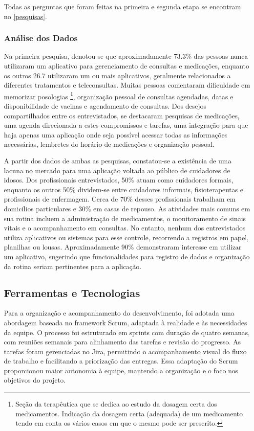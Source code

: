 \documentclass[
	article,			%
	12pt,				%
	oneside,			%
	a4paper,			%
    BIBLATEX,           %
	english,			%
	brazil,				%
	sumario=tradicional
	]{abntex2}
\begin{document}
Todas as perguntas que foram feitas na primeira e segunda etapa se encontram no \autoref{pesquisas}.

\subsubsection{Análise dos Dados}

Na primeira pesquisa, denotou-se que aproximadamente 73.3\% das pessoas nunca utilizaram um aplicativo para gerenciamento de consultas e medicações, enquanto os outros 26.7 utilizaram um ou mais aplicativos, geralmente relacionados a diferentes tratamentos e teleconsultas. Muitas pessoas comentaram dificuldade em memorizar posologias
\footnote[1]{Seção da terapêutica que se dedica ao estudo da dosagem certa dos medicamentos. Indicação da dosagem certa (adequada) de um medicamento tendo em conta os vários casos em que o mesmo pode ser prescrito.}, 
organização pessoal de consultas agendadas, datas e disponibilidade de vacinas e agendamento de consultas. Dos desejos compartilhados entre os entrevistados, se destacaram pesquisas de medicações, uma agenda direcionada a estes compromissos e tarefas, uma integração para que haja apenas uma aplicação onde seja possível acessar todas as informações necessárias, lembretes do horário de medicações e organização pessoal.

A partir dos dados de ambas as pesquisas, constatou-se a existência de uma lacuna no mercado para uma aplicação voltada ao público de cuidadores de idosos. Dos profissionais entrevistados, 50\% atuam como cuidadores formais, enquanto os outros 50\% dividem-se entre cuidadores informais, fisioterapeutas e profissionais de enfermagem. Cerca de 70\% desses profissionais trabalham em domicílios particulares e 30\% em casas de repouso. As atividades mais comuns em sua rotina incluem a administração de medicamentos, o monitoramento de sinais vitais e o acompanhamento em consultas. No entanto, nenhum dos entrevistados utiliza aplicativos ou sistemas para esse controle, recorrendo a registros em papel, planilhas ou lousas. Aproximadamente 90\% demonstraram interesse em utilizar um aplicativo, sugerindo que funcionalidades para registro de dados e organização da rotina seriam pertinentes para a aplicação.

\subsection{Ferramentas e Tecnologias}

Para a organização e acompanhamento do desenvolvimento, foi adotada uma abordagem baseada no framework Scrum, adaptada à realidade e às necessidades da equipe. O processo foi estruturado em sprints com duração de quatro semanas, com reuniões semanais para alinhamento das tarefas e revisão do progresso. As tarefas foram gerenciadas no Jira, permitindo o acompanhamento visual do fluxo de trabalho e facilitando a priorização das entregas. Essa adaptação do Scrum proporcionou maior autonomia à equipe, mantendo a organização e o foco nos objetivos do projeto.
\end{document}
